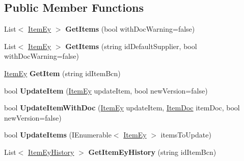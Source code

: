 \subsection*{Public Member Functions}
\begin{DoxyCompactItemize}
\item 
\mbox{\label{class_h_k_supply_1_1_services_1_1_implementations_1_1_e_f_item_ey_afb999062e0f8d5611529d83c44f839b1}} 
List$<$ \mbox{\hyperlink{class_h_k_supply_1_1_models_1_1_item_ey}{Item\+Ey}} $>$ {\bfseries Get\+Items} (bool with\+Doc\+Warning=false)
\item 
\mbox{\label{class_h_k_supply_1_1_services_1_1_implementations_1_1_e_f_item_ey_a7827eb2d3b568be7c36f1a681c10d7d6}} 
List$<$ \mbox{\hyperlink{class_h_k_supply_1_1_models_1_1_item_ey}{Item\+Ey}} $>$ {\bfseries Get\+Items} (string id\+Default\+Supplier, bool with\+Doc\+Warning=false)
\item 
\mbox{\label{class_h_k_supply_1_1_services_1_1_implementations_1_1_e_f_item_ey_ae02f938860b0b5a49535d63aa6430786}} 
\mbox{\hyperlink{class_h_k_supply_1_1_models_1_1_item_ey}{Item\+Ey}} {\bfseries Get\+Item} (string id\+Item\+Bcn)
\item 
\mbox{\label{class_h_k_supply_1_1_services_1_1_implementations_1_1_e_f_item_ey_a3f8aa4572b3fd9187bfc4f79f1b04ee3}} 
bool {\bfseries Update\+Item} (\mbox{\hyperlink{class_h_k_supply_1_1_models_1_1_item_ey}{Item\+Ey}} update\+Item, bool new\+Version=false)
\item 
\mbox{\label{class_h_k_supply_1_1_services_1_1_implementations_1_1_e_f_item_ey_a4fd3ea503b99fe75242de5a85e004e9c}} 
bool {\bfseries Update\+Item\+With\+Doc} (\mbox{\hyperlink{class_h_k_supply_1_1_models_1_1_item_ey}{Item\+Ey}} update\+Item, \mbox{\hyperlink{class_h_k_supply_1_1_models_1_1_item_doc}{Item\+Doc}} item\+Doc, bool new\+Version=false)
\item 
\mbox{\label{class_h_k_supply_1_1_services_1_1_implementations_1_1_e_f_item_ey_abeee04ecbd7d970306bc471141d9709e}} 
bool {\bfseries Update\+Items} (I\+Enumerable$<$ \mbox{\hyperlink{class_h_k_supply_1_1_models_1_1_item_ey}{Item\+Ey}} $>$ items\+To\+Update)
\item 
\mbox{\label{class_h_k_supply_1_1_services_1_1_implementations_1_1_e_f_item_ey_aba9a23006ed79a13d07e557dfe2a5fe4}} 
List$<$ \mbox{\hyperlink{class_h_k_supply_1_1_models_1_1_item_ey_history}{Item\+Ey\+History}} $>$ {\bfseries Get\+Item\+Ey\+History} (string id\+Item\+Bcn)
\end{DoxyCompactItemize}


